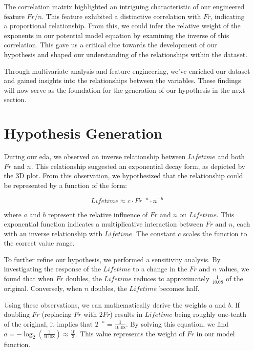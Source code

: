 The correlation matrix highlighted an intriguing characteristic of our engineered feature $Fr/n$. This feature exhibited a distinctive correlation with $Fr$, indicating a proportional relationship. From this, we could infer the relative weight of the exponents in our potential model equation by examining the inverse of this correlation. This gave us a critical clue towards the development of our hypothesis and shaped our understanding of the relationships within the dataset.

Through multivariate analysis and feature engineering, we've enriched our dataset and gained insights into the relationships between the variables. These findings will now serve as the foundation for the generation of our hypothesis in the next section.


\section{Hypothesis Generation}

During our \ac{eda}, we observed an inverse relationship between $Lifetime$ and both $Fr$ and $n$. This relationship suggested an exponential decay form, as depicted by the 3D plot. From this observation, we hypothesized that the relationship could be represented by a function of the form:

\begin{equation}
\label{eq:hypothesis}
{Lifetime} \approx c \cdot Fr^{-a} \cdot n^{-b}
\end{equation}

where $a$ and $b$ represent the relative influence of $Fr$ and $n$ on $Lifetime$. This exponential function indicates a multiplicative interaction between $Fr$ and $n$, each with an inverse relationship with $Lifetime$. The constant $c$ scales the function to the correct value range.

To further refine our hypothesis, we performed a sensitivity analysis. By investigating the response of the $Lifetime$ to a change in the $Fr$ and $n$ values, we found that when $Fr$ doubles, the $Lifetime$ reduces to approximately $\frac{1}{10.08}$ of the original. Conversely, when $n$ doubles, the $Lifetime$ becomes half. 

Using these observations, we can mathematically derive the weights $a$ and $b$. If doubling $Fr$ (replacing $Fr$ with $2Fr$) results in $Lifetime$ being roughly one-tenth of the original, it implies that $2^{-a} = \frac{1}{10.08}$. By solving this equation, we find $a = -\log_2(\frac{1}{10.08}) \approx \frac{10}{3}$. This value represents the weight of $Fr$ in our model function.

